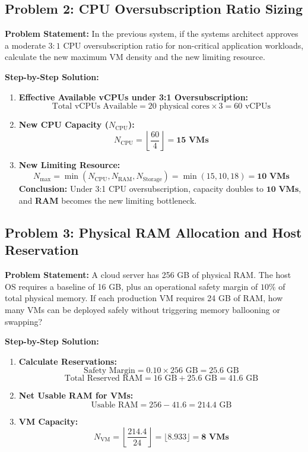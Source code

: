 \subsection*{Problem 2: CPU Oversubscription Ratio Sizing}
\textbf{Problem Statement:} In the previous system, if the systems architect approves a moderate $3:1$ CPU oversubscription ratio for non-critical application workloads, calculate the new maximum VM density and the new limiting resource.

\textbf{Step-by-Step Solution:}
\begin{enumerate}[label=\arabic*.]
    \item \textbf{Effective Available vCPUs under 3:1 Oversubscription:}
    \[
    \text{Total vCPUs Available} = 20 \text{ physical cores} \times 3 = 60 \text{ vCPUs}
    \]
    \item \textbf{New CPU Capacity ($N_{\text{CPU}}$):}
    \[
    N_{\text{CPU}} = \left\lfloor \frac{60}{4} \right\rfloor = \mathbf{15\text{ VMs}}
    \]
    \item \textbf{New Limiting Resource:}
    \[
    N_{\max} = \min(N_{\text{CPU}}, N_{\text{RAM}}, N_{\text{Storage}}) = \min(15, 10, 18) = \mathbf{10\text{ VMs}}
    \]
    \textbf{Conclusion:} Under 3:1 CPU oversubscription, capacity doubles to $\mathbf{10\text{ VMs}}$, and \textbf{RAM} becomes the new limiting bottleneck.

\end{enumerate}

\subsection*{Problem 3: Physical RAM Allocation and Host Reservation}
\textbf{Problem Statement:} A cloud server has 256 GB of physical RAM. The host OS requires a baseline of 16 GB, plus an operational safety margin of $10\%$ of total physical memory. If each production VM requires 24 GB of RAM, how many VMs can be deployed safely without triggering memory ballooning or swapping?

\textbf{Step-by-Step Solution:}
\begin{enumerate}[label=\arabic*.]
    \item \textbf{Calculate Reservations:}
    \[
    \text{Safety Margin} = 0.10 \times 256\text{ GB} = 25.6\text{ GB}
    \]
    \[
    \text{Total Reserved RAM} = 16\text{ GB} + 25.6\text{ GB} = 41.6\text{ GB}
    \]
    \item \textbf{Net Usable RAM for VMs:}
    \[
    \text{Usable RAM} = 256 - 41.6 = 214.4\text{ GB}
    \]
    \item \textbf{VM Capacity:}
    \[
    N_{\text{VM}} = \left\lfloor \frac{214.4}{24} \right\rfloor = \lfloor 8.933 \rfloor = \mathbf{8\text{ VMs}}
    \]
\end{enumerate}

